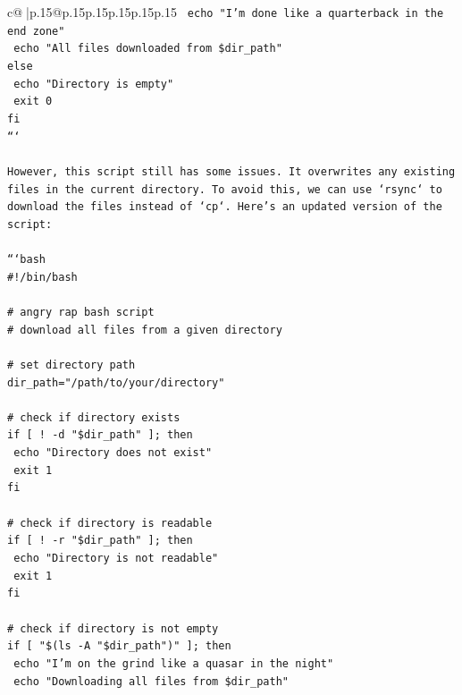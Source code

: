 \documentclass{article}
\begin{document}
{\begin{supertabular}{c@{$\;$}|p{.15\linewidth}@{}p{.15\linewidth}p{.15\linewidth}p{.15\linewidth}p{.15\linewidth}p{.15\linewidth}}
{{{\texttt{  echo "I'm done like a quarterback in the end zone"} \\
\texttt{  echo "All files downloaded from \$dir\_path"} \\
\texttt{else} \\
\texttt{  echo "Directory is empty"} \\
\texttt{  exit 0} \\
\texttt{fi} \\
\texttt{```} \\
\\ 
\texttt{However, this script still has some issues. It overwrites any existing files in the current directory. To avoid this, we can use `rsync` to download the files instead of `cp`. Here's an updated version of the script:} \\
\\ 
\texttt{```bash} \\
\texttt{\#!/bin/bash} \\
\\ 
\texttt{\# angry rap bash script} \\
\texttt{\# download all files from a given directory} \\
\\ 
\texttt{\# set directory path} \\
\texttt{dir\_path="/path/to/your/directory"} \\
\\ 
\texttt{\# check if directory exists} \\
\texttt{if {[} ! {-}d "\$dir\_path" {]}; then} \\
\texttt{  echo "Directory does not exist"} \\
\texttt{  exit 1} \\
\texttt{fi} \\
\\ 
\texttt{\# check if directory is readable} \\
\texttt{if {[} ! {-}r "\$dir\_path" {]}; then} \\
\texttt{  echo "Directory is not readable"} \\
\texttt{  exit 1} \\
\texttt{fi} \\
\\ 
\texttt{\# check if directory is not empty} \\
\texttt{if {[} "\$(ls {-}A "\$dir\_path")" {]}; then} \\
\texttt{  echo "I'm on the grind like a quasar in the night"} \\
\texttt{  echo "Downloading all files from \$dir\_path"} \\
}}}
\end{supertabular}}
\end{document}
